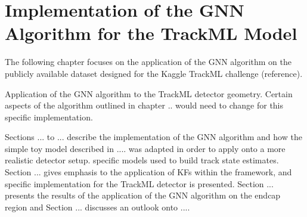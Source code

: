 


\chapter{Implementation of the GNN Algorithm for the TrackML Model}
\label{chapter-6}

The following chapter focuses on the application of the GNN algorithm on the publicly available dataset designed for the Kaggle TrackML challenge (reference).

Application of the GNN algorithm to the TrackML detector geometry. Certain aspects of the algorithm outlined in chapter .. would need to change for this specific implementation.

Sections ... to ... describe the implementation of the GNN algorithm and how the simple toy model described in .... was adapted in order to apply onto a more realistic detector setup. specific models used to build track state estimates. Section ... gives emphasis to the application of KFs within the framework, and specific implementation for the TrackML detector is presented. Section ... presents the results of the application of the GNN algorithm on the endcap region and Section ... discusses an outlook onto ....






